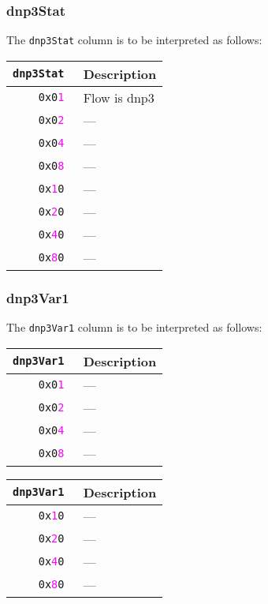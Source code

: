 \documentclass[documentation]{subfiles}
\begin{document}
\subsubsection{dnp3Stat}\label{dnp3Stat}
The {\tt dnp3Stat} column is to be interpreted as follows:
\begin{longtable}{>{\tt}rl}
    \toprule
    {\bf dnp3Stat} & {\bf Description}\\
    \midrule\endhead%
    0x0\textcolor{magenta}{1} & Flow is dnp3\\
    0x0\textcolor{magenta}{2} & ---\\
    0x0\textcolor{magenta}{4} & ---\\
    0x0\textcolor{magenta}{8} & ---\\
    0x\textcolor{magenta}{1}0 & ---\\
    0x\textcolor{magenta}{2}0 & ---\\
    0x\textcolor{magenta}{4}0 & ---\\
    0x\textcolor{magenta}{8}0 & ---\\
    \bottomrule
\end{longtable}

\subsubsection{dnp3Var1}\label{dnp3Var1}
The {\tt dnp3Var1} column is to be interpreted as follows:\\
\begin{minipage}{.48\textwidth}
    \begin{longtable}{>{\tt}rl}
        \toprule
        {\bf dnp3Var1} & {\bf Description}\\
        \midrule\endhead%
        0x0\textcolor{magenta}{1} & ---\\
        0x0\textcolor{magenta}{2} & ---\\
        0x0\textcolor{magenta}{4} & ---\\
        0x0\textcolor{magenta}{8} & ---\\
        \bottomrule
    \end{longtable}
\end{minipage}
\hfill
\begin{minipage}{.48\textwidth}
    \begin{longtable}{>{\tt}rl}
        \toprule
        {\bf dnp3Var1} & {\bf Description}\\
        \midrule\endhead%
        0x\textcolor{magenta}{1}0 & ---\\
        0x\textcolor{magenta}{2}0 & ---\\
        0x\textcolor{magenta}{4}0 & ---\\
        0x\textcolor{magenta}{8}0 & ---\\
        \bottomrule
    \end{longtable}
\end{minipage}
\end{document}
